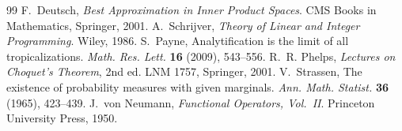 \documentclass[11pt]{article}
\theoremstyle{definition}
\begin{document}
\begin{thebibliography}{99}
 F.~Deutsch, \emph{Best Approximation in Inner Product Spaces}. CMS Books in Mathematics, Springer, 2001.
 A.~Schrijver, \emph{Theory of Linear and Integer Programming}. Wiley, 1986.
 S.~Payne, Analytification is the limit of all tropicalizations. \emph{Math. Res. Lett.} \textbf{16} (2009), 543--556.
 R.~R. Phelps, \emph{Lectures on Choquet's Theorem}, 2nd ed. LNM 1757, Springer, 2001.
 V.~Strassen, The existence of probability measures with given marginals. \emph{Ann. Math. Statist.} \textbf{36}
(1965), 423--439.
 J.~von Neumann, \emph{Functional Operators, Vol.~II}. Princeton University Press, 1950.
\end{thebibliography}
\end{document}
